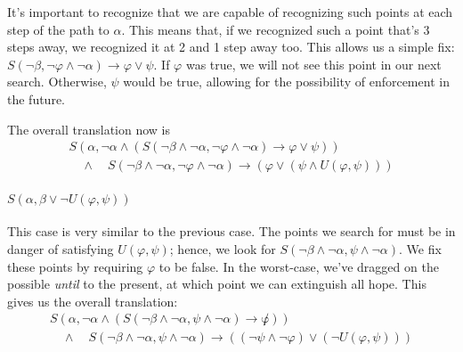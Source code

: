 \documentclass[a4paper,UKenglish,cleveref, autoref, thm-restate]{lipics-v2021}
\begin{document}
It's important to recognize that we are capable of recognizing such points at each step of the path to $\alpha$. This means that, if we recognized such a point that's 3 steps away, we recognized it at 2 and 1 step away too. This allows us a simple fix: $S(\lnot \beta, \lnot \varphi \land \lnot \alpha) \to \varphi \lor \psi$. If $\varphi$ was true, we will not see this point in our next search. Otherwise, $\psi$ would be true, allowing for the possibility of enforcement in the future.

The overall translation now is
\begin{equation*}
    \begin{aligned}
    S(\alpha, \lnot \alpha \land (S(\lnot \beta \land \lnot \alpha, \lnot \varphi \land \lnot \alpha) \to \varphi \lor \psi)) \\
    \quad \land \quad S(\lnot \beta \land \lnot \alpha, \lnot \varphi \land \lnot \alpha) \to (\varphi \lor (\psi \land U(\varphi, \psi)))
    \end{aligned}
\end{equation*}

\paragraph*{$S(\alpha, \beta \lor \lnot U(\varphi, \psi))$}
This case is very similar to the previous case. The points we search for must be in danger of satisfying $U(\varphi, \psi)$; hence, we look for $S(\lnot \beta \land \lnot \alpha, \psi \land \lnot \alpha)$. We fix these points by requiring $\varphi$ to be false. In the worst-case, we've dragged on the possible \textit{until} to the present, at which point we can extinguish all hope. This gives us the overall translation:
\begin{equation*}
    \begin{aligned}
    S(\alpha, \lnot \alpha \land (S(\lnot \beta \land \lnot \alpha, \psi \land \lnot \alpha) \to \not \varphi)) \\
    \quad \land \quad S(\lnot \beta \land \lnot \alpha, \psi \land \lnot \alpha) \to ((\lnot \psi \land \lnot \varphi) \lor (\lnot U(\varphi, \psi)))
    \end{aligned}
\end{equation*}
\end{document}
